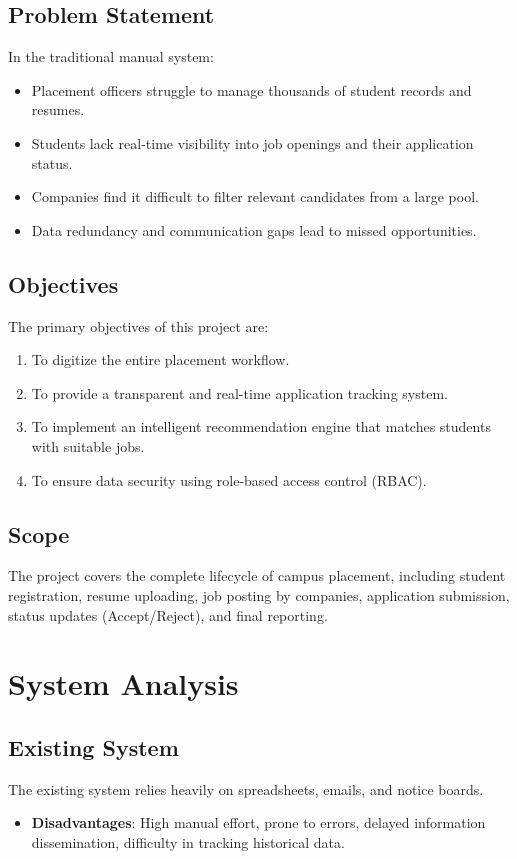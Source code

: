 \documentclass[12pt, a4paper]{report}
\begin{document}
\section{Problem Statement}
In the traditional manual system:
\begin{itemize}
    \item Placement officers struggle to manage thousands of student records and resumes.
    \item Students lack real-time visibility into job openings and their application status.
    \item Companies find it difficult to filter relevant candidates from a large pool.
    \item Data redundancy and communication gaps lead to missed opportunities.
\end{itemize}

\section{Objectives}
The primary objectives of this project are:
\begin{enumerate}
    \item To digitize the entire placement workflow.
    \item To provide a transparent and real-time application tracking system.
    \item To implement an intelligent recommendation engine that matches students with suitable jobs.
    \item To ensure data security using role-based access control (RBAC).
\end{enumerate}

\section{Scope}
The project covers the complete lifecycle of campus placement, including student registration, resume uploading, job posting by companies, application submission, status updates (Accept/Reject), and final reporting.

\chapter{System Analysis}

\section{Existing System}
The existing system relies heavily on spreadsheets, emails, and notice boards.
\begin{itemize}
    \item \textbf{Disadvantages}: High manual effort, prone to errors, delayed information dissemination, difficulty in tracking historical data.
\end{itemize}
\end{document}
